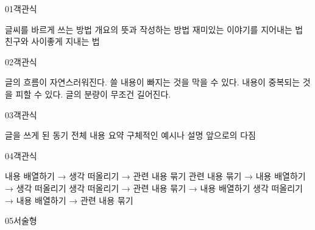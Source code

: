 \documentclass[fs11,seriesFre]{korfarm-base}
\begin{document}
\begin{kfQBlock}{01}{객관식}
\begin{kfChoices}
\kfChoice 글씨를 바르게 쓰는 방법
\kfChoice 개요의 뜻과 작성하는 방법
\kfChoice 재미있는 이야기를 지어내는 법
\kfChoice 친구와 사이좋게 지내는 법
\end{kfChoices}
\end{kfQBlock}
\begin{kfQBlock}{02}{객관식}
\begin{kfChoices}
\kfChoice 글의 흐름이 자연스러워진다.
\kfChoice 쓸 내용이 빠지는 것을 막을 수 있다.
\kfChoice 내용이 중복되는 것을 피할 수 있다.
\kfChoice 글의 분량이 무조건 길어진다.
\end{kfChoices}
\end{kfQBlock}
\begin{kfQBlock}{03}{객관식}
\begin{kfChoices}
\kfChoice 글을 쓰게 된 동기
\kfChoice 전체 내용 요약
\kfChoice 구체적인 예시나 설명
\kfChoice 앞으로의 다짐
\end{kfChoices}
\end{kfQBlock}
\begin{kfQBlock}{04}{객관식}
\begin{kfChoices}
\kfChoice 내용 배열하기 → 생각 떠올리기 → 관련 내용 묶기
\kfChoice 관련 내용 묶기 → 내용 배열하기 → 생각 떠올리기
\kfChoice 생각 떠올리기 → 관련 내용 묶기 → 내용 배열하기
\kfChoice 생각 떠올리기 → 내용 배열하기 → 관련 내용 묶기
\end{kfChoices}
\end{kfQBlock}
\begin{kfQBlock}{05}{서술형}
\end{kfQBlock}


\end{document}

